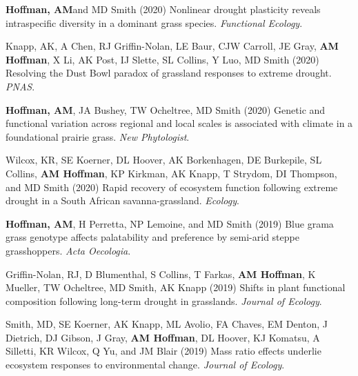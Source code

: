 \documentclass{cv}
\begin{document}
\begin{pubenum}
\item\textbf{Hoffman, AM}\footnotemark[1] and MD Smith (2020) Nonlinear drought plasticity reveals intraspecific diversity in a dominant grass species. \textit{Functional Ecology}. \footnotemark[\value{footnote}]

\item Knapp, AK, A Chen, RJ Griffin-Nolan, LE Baur, CJW Carroll, JE Gray, \textbf{AM Hoffman}, X Li, AK Post, IJ Slette, SL Collins, Y Luo, MD Smith (2020) Resolving the Dust Bowl paradox of grassland responses to extreme drought. \textit{PNAS}. 

\item\textbf{Hoffman, AM}\footnotemark[1], JA Bushey, TW Ocheltree, MD Smith (2020) Genetic and functional variation across regional and local scales is associated with climate in a foundational prairie grass. \textit{New Phytologist}. 

\item Wilcox, KR, SE Koerner, DL Hoover, AK Borkenhagen, DE Burkepile, SL Collins, \textbf{AM Hoffman}, KP Kirkman, AK Knapp, T Strydom, DI Thompson, and MD Smith (2020) Rapid recovery of ecosystem function following extreme drought in a South African savanna-grassland. \textit{Ecology}. 

\item\textbf{Hoffman, AM}\footnotemark[1], H Perretta\footnotemark[2], NP Lemoine, and MD Smith (2019) Blue grama grass genotype affects palatability and preference by semi-arid steppe grasshoppers. \textit{Acta Oecologia}. 


\item Griffin-Nolan, RJ, D Blumenthal, S Collins, T Farkas, \textbf{AM Hoffman}, K Mueller, TW Ocheltree, MD Smith, AK Knapp (2019) Shifts in plant functional composition following long-term drought in grasslands. \textit{Journal of Ecology}. 

\item Smith, MD, SE Koerner, AK Knapp, ML Avolio, FA Chaves, EM Denton, J Dietrich, DJ Gibson, J Gray, \textbf{AM Hoffman}, DL Hoover, KJ Komatsu, A Silletti, KR Wilcox, Q Yu, and JM Blair (2019) Mass ratio effects underlie ecosystem responses to environmental change. \textit{Journal of Ecology}. 


\end{pubenum}
\end{document}
